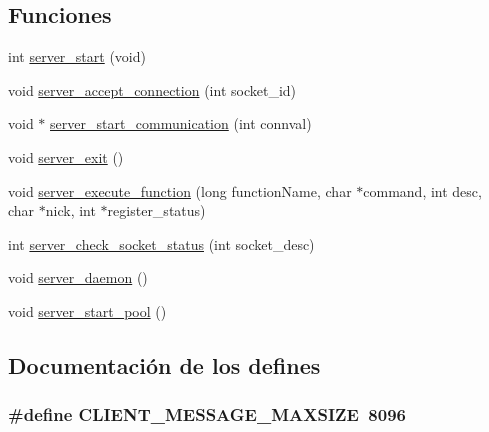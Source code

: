 \subsection*{Funciones}
\begin{DoxyCompactItemize}
\item 
int \hyperlink{G-2313-06-P1__server_8h_a85f40553bba77ada6c4329db58f68630}{server\+\_\+start} (void)
\item 
void \hyperlink{G-2313-06-P1__server_8h_ab201db206f26ab6fb26bb0e36dac4589}{server\+\_\+accept\+\_\+connection} (int socket\+\_\+id)
\item 
void $\ast$ \hyperlink{G-2313-06-P1__server_8h_a567404fb6edb67d9035359fef8e5acf3}{server\+\_\+start\+\_\+communication} (int connval)
\item 
void \hyperlink{G-2313-06-P1__server_8h_a0e947005d451a8f3bf3af01f54b59f11}{server\+\_\+exit} ()
\item 
void \hyperlink{G-2313-06-P1__server_8h_a775161328c3264fb8f96981f7a9c83ae}{server\+\_\+execute\+\_\+function} (long function\+Name, char $\ast$command, int desc, char $\ast$nick, int $\ast$register\+\_\+status)
\item 
int \hyperlink{G-2313-06-P1__server_8h_a64f1fffc5903ccf0350845cd21a95b6e}{server\+\_\+check\+\_\+socket\+\_\+status} (int socket\+\_\+desc)
\item 
void \hyperlink{G-2313-06-P1__server_8h_aa0e8000b12d9c52fc1e87847d00c9c47}{server\+\_\+daemon} ()
\item 
void \hyperlink{G-2313-06-P1__server_8h_a48d522cd984dc64ecd084f05416b1a94}{server\+\_\+start\+\_\+pool} ()
\end{DoxyCompactItemize}


\subsection{Documentación de los \textquotesingle{}defines\textquotesingle{}}
\hypertarget{G-2313-06-P1__server_8h_a97ed8e840fc4086fc86554e6d1277ca8}{}
\subsubsection[{C\+L\+I\+E\+N\+T\+\_\+\+M\+E\+S\+S\+A\+G\+E\+\_\+\+M\+A\+X\+S\+I\+Z\+E}]{\setlength{\rightskip}{0pt plus 5cm}\#define C\+L\+I\+E\+N\+T\+\_\+\+M\+E\+S\+S\+A\+G\+E\+\_\+\+M\+A\+X\+S\+I\+Z\+E~8096}\label{G-2313-06-P1__server_8h_a97ed8e840fc4086fc86554e6d1277ca8}


